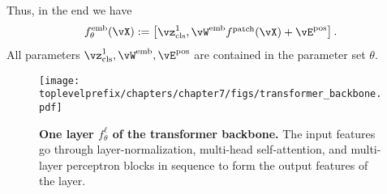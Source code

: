 \documentclass[\toplevelprefix/book-main.tex]{subfiles}
\begin{document}
Thus, in the end we have 
\begin{equation}\label{eq:definition_of_embedding_module}
    f_{\theta}^{\emb}(\vX) := \mat{\vz_{\cls}^{1}, \vW^{\emb}f^{\patch}(\vX) + \vE^{\pos}}.
\end{equation}
All parameters \(\vz_{\cls}^{1}, \vW^{\emb}, \vE^{\pos}\) are contained in the parameter set \(\theta\).

\begin{figure}
    \centering 
    \texttt{[image: \\toplevelprefix/chapters/chapter7/figs/transformer\_backbone.pdf]}
    \caption{\small\textbf{One layer \(f_{\theta}^{\ell}\) of the transformer backbone.} The input features go through layer-normalization, multi-head self-attention, and multi-layer perceptron blocks in sequence to form the output features of the layer.}
    \label{fig:transformer_backbone}
\end{figure}
\end{document}
